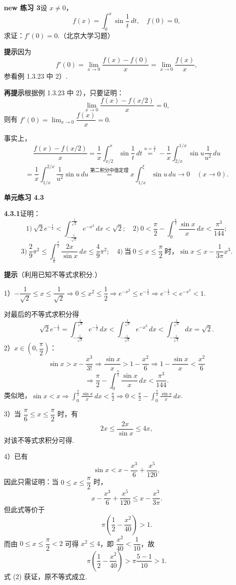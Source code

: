 \documentclass[UTF8,12pt,a4paper,fontset=fandol]{ctexart}
\begin{document}
\noindent\textbf{new 练习 3}\quad 设 $x\ne0$，
\[
f(x)=\int_0^x\sin\frac1t\,dt,\quad f(0)=0,
\]
求证：$f'(0)=0$.（北京大学习题）

\noindent\textbf{提示}\quad 因为
\[
f'(0)=\lim_{x\to0}\frac{f(x)-f(0)}x=\lim_{x\to0}\frac{f(x)}x,
\]
参看例 1.3.23 中 2）.

\noindent\textbf{再提示}\quad 根据例 1.3.23 中 2），只要证明：
\[
\lim_{x\to0}\frac{f(x)-f(x/2)}x=0,
\]
则有 $f'(0)=\displaystyle\lim_{x\to0}\dfrac{f(x)}x=0$.

事实上，
\[
\frac{f(x)-f(x/2)}x
=\frac1x\int_{x/2}^x\sin\frac1t\,dt
\stackrel{u=\frac1t}{=}
-\frac1x\int_{2/x}^{1/x}\sin u\frac1{u^2}\,du
\]
\[
=\frac1x\int_{1/x}^{2/x}\frac1{u^2}\sin u\,du
\stackrel{\text{第二积分中值定理}}{=}
x\int_{1/x}^{\xi}\sin u\,du\to0\quad(x\to0).
\]

\noindent\textbf{单元练习 4.3}

\noindent\textbf{4.3.1}\quad 证明：
\[
1)\ \sqrt2e^{-\frac12}<\int_{-\frac1{\sqrt2}}^{\frac1{\sqrt2}}e^{-x^2}\,dx<\sqrt2;
\quad
2)\ 0<\frac\pi2-\int_0^{\frac\pi2}\frac{\sin x}{x}\,dx<\frac{\pi^3}{144};
\]
\[
3)\ \frac29\pi^2\le\int_{\frac\pi6}^{\frac\pi2}\frac{2x}{\sin x}\,dx\le\frac49\pi^2;
\quad
4)\ 当\ 0\le x\le\frac\pi2\ 时，\sin x\le x-\frac1{3\pi}x^3.
\]

\noindent\textbf{提示}\quad （利用已知不等式求积分.）

1）$-\dfrac1{\sqrt2}\le x\le\dfrac1{\sqrt2}\Rightarrow0\le x^2\le\dfrac12
\Rightarrow e^{-x^2}\le e^{-\frac12}\Rightarrow e^{-\frac12}<e^{-x^2}<1$.

对最后的不等式求积分得
\[
\sqrt2e^{-\frac12}
=\int_{-\frac1{\sqrt2}}^{\frac1{\sqrt2}}e^{-\frac12}\,dx
<\int_{-\frac1{\sqrt2}}^{\frac1{\sqrt2}}e^{-x^2}\,dx
<\int_{-\frac1{\sqrt2}}^{\frac1{\sqrt2}}dx=\sqrt2.
\]
2）$x\in\left(0,\dfrac\pi2\right)$：
\[
\sin x>x-\frac{x^3}{3!}\Rightarrow
\frac{\sin x}{x}>1-\frac{x^2}{6}
\Rightarrow 1-\frac{\sin x}{x}<\frac{x^2}{6}
\]
\[
\Rightarrow\frac\pi2-\int_0^{\frac\pi2}\frac{\sin x}{x}\,dx<\frac{\pi^3}{144}.
\]
类似地，$\sin x<x\Rightarrow\displaystyle\int_0^{\frac\pi2}\frac{\sin x}{x}\,dx<\frac\pi2
\Rightarrow0<\frac\pi2-\int_0^{\frac\pi2}\frac{\sin x}{x}\,dx$.

3）当 $\dfrac\pi6\le x\le\dfrac\pi2$ 时，有
\[
2x\le\frac{2x}{\sin x}\le4x,
\]
对该不等式求积分可得.

4）已有
\[
\sin x<x-\frac{x^3}{6}+\frac{x^5}{120},
\]
因此只需证明：当 $0\le x\le\dfrac\pi2$ 时，
\[
x-\frac{x^3}{6}+\frac{x^5}{120}\le x-\frac{x^3}{3\pi}.
\tag{1}
\]
但此式等价于
\[
\pi\left(\frac12-\frac{x^2}{40}\right)>1.
\tag{2}
\]
而由 $0\le x\le\dfrac\pi2<2$ 可得 $x^2\le4$，即 $\dfrac{x^2}{40}<\dfrac1{10}$，故
\[
\pi\left(\frac12-\frac{x^2}{40}\right)>\pi\frac{5-1}{10}>1.
\]
式 (2) 获证，原不等式成立.
\end{document}
